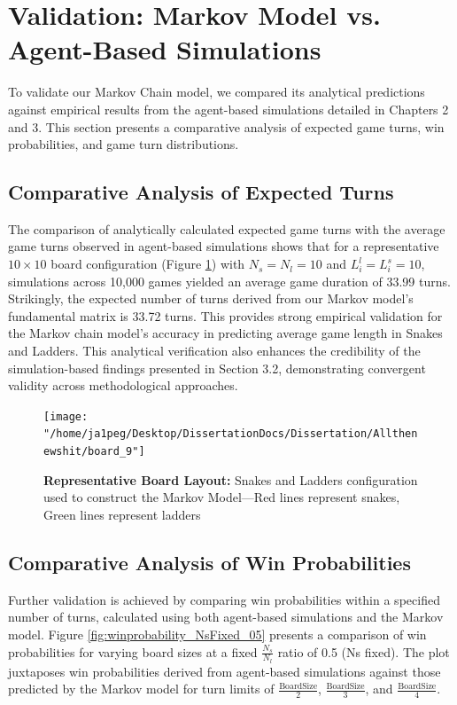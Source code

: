 \section{Validation: Markov Model vs. Agent-Based Simulations}
To validate our Markov Chain model, we compared its analytical predictions against empirical results from the agent-based simulations detailed in Chapters 2 and 3. This section presents a comparative analysis of expected game turns, win probabilities, and game turn distributions.

\subsection{Comparative Analysis of Expected Turns}

The comparison of analytically calculated expected game turns with the average game turns observed in agent-based simulations shows that for a representative $10\times10$ board configuration (Figure \ref{fig:boardlayout}) with $N_s=N_l=10$ and $L^l_i=L^s_i=10$, simulations across 10,000 games yielded an average game duration of 33.99 turns. Strikingly, the expected number of turns derived from our Markov model's fundamental matrix is 33.72 turns. This provides strong empirical validation for the Markov chain model's accuracy in predicting average game length in Snakes and Ladders. This analytical verification also enhances the credibility of the simulation-based findings presented in Section 3.2, demonstrating convergent validity across methodological approaches.

\begin{figure}
	\centering
	\texttt{[image: "/home/ja1peg/Desktop/DissertationDocs/Dissertation/Allthenewshit/board\_9"]}
	\caption{\textbf{Representative Board Layout:} Snakes and Ladders configuration used to construct the Markov Model—Red lines represent snakes, Green lines represent ladders}
	\label{fig:boardlayout}
\end{figure}

\subsection{Comparative Analysis of Win Probabilities}

Further validation is achieved by comparing win probabilities within a specified number of turns, calculated using both agent-based simulations and the Markov model. Figure \ref{fig:winprobability_NsFixed_05} presents a comparison of win probabilities for varying board sizes at a fixed $\frac{N_s}{N_l}$ ratio of 0.5 (Ns fixed).  The plot juxtaposes win probabilities derived from agent-based simulations against those predicted by the Markov model for turn limits of $\frac{\text{BoardSize}}{2}$, $\frac{\text{BoardSize}}{3}$, and $\frac{\text{BoardSize}}{4}$.

